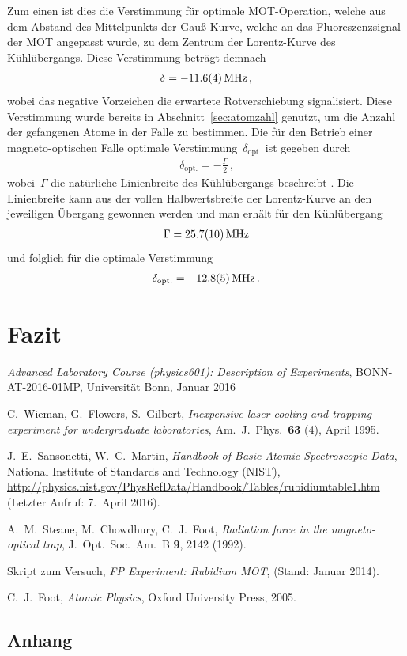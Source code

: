 \documentclass[11pt, a4paper]{article}
\numberwithin{equation}{section}
\begin{document}
Zum einen ist dies die Verstimmung für optimale MOT-Operation, welche aus dem Abstand des Mittelpunkts der Gauß-Kurve, welche an das Fluoreszenzsignal der MOT angepasst wurde, zu dem Zentrum der Lorentz-Kurve des Kühlübergangs.
Diese Verstimmung beträgt demnach
\begin{align*}
	\delta = \SI{-11.6 +- 0.4}{MHz} \, \text{,}
\end{align*}
wobei das negative Vorzeichen die erwartete Rotverschiebung signalisiert.
Diese Verstimmung wurde bereits in Abschnitt~\ref{sec:atomzahl} genutzt, um die Anzahl der gefangenen Atome in der Falle zu bestimmen.
Die für den Betrieb einer magneto-optischen Falle optimale Verstimmung~$\delta_\mathrm{opt.}$ ist gegeben durch
\begin{align*}
	\delta_\mathrm{opt.} = -\frac{\Gamma}{2} \, \text{,}
\end{align*}
wobei~$\Gamma$ die natürliche Linienbreite des Kühlübergangs beschreibt \cite{foot}.
Die Linienbreite kann aus der vollen Halbwertsbreite der Lorentz-Kurve an den jeweiligen Übergang gewonnen werden und man erhält für den Kühlübergang
\begin{align*}
	\Gamma = \SI{25.7 +- 1.0}{MHz}
\end{align*}
und folglich für die optimale Verstimmung
\begin{align*}
	\delta_\mathrm{opt.} = \SI{-12.8 +- 0.5}{MHz} \, \text{.}
\end{align*}






\section{Fazit}


\FloatBarrier
\vspace{\fill}
\begin{thebibliography}{19}
	\emph{Advanced Laboratory Course (physics601): Description of Experiments}, BONN-AT-2016-01MP, Universität Bonn, Januar 2016

	C.\ Wieman, G.\ Flowers, S.\ Gilbert,
	\emph{Inexpensive laser cooling and trapping experiment for undergraduate laboratories},
	Am.\ J.\ Phys.\ \textbf{63} (4), April 1995.

	J.\ E.\ Sansonetti, W.\ C.\ Martin,
	\emph{Handbook of Basic Atomic Spectroscopic Data},
	National Institute of Standards and Technology (NIST), \url{http://physics.nist.gov/PhysRefData/Handbook/Tables/rubidiumtable1.htm} (Letzter Aufruf: 7.\ April 2016).

	A.\ M.\ Steane, M.\ Chowdhury, C.\ J.\ Foot,
	\emph{Radiation force in the magneto-optical trap},
	J.\ Opt.\ Soc.\ Am.\ B \textbf{9}, 2142 (1992).

	Skript zum Versuch,
	\emph{FP Experiment: Rubidium MOT},
	(Stand: Januar 2014).

	C.\ J.\ Foot,
	\emph{Atomic Physics},
	Oxford University Press, 2005.
\end{thebibliography}

\begin{appendix}
\newpage
\section{Anhang}
\end{appendix}
\end{document}
